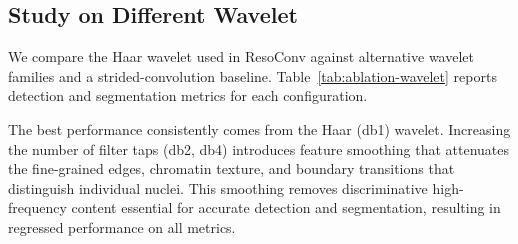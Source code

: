 \subsection{Study on Different Wavelet}
\label{sec:ablation-wavelet}

We compare the Haar wavelet used in ResoConv against alternative wavelet families and a
strided-convolution baseline. Table~\ref{tab:ablation-wavelet} reports detection and
segmentation metrics for each configuration.



The best performance consistently comes from the Haar (db1) wavelet. Increasing the number of filter taps (db2, db4) introduces feature smoothing that attenuates the fine-grained edges, chromatin texture, and boundary transitions that distinguish individual nuclei. This smoothing removes discriminative high-frequency content essential for accurate detection and segmentation, resulting in regressed performance on all metrics.
